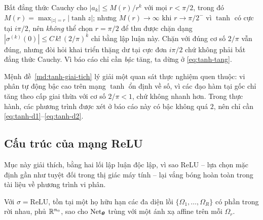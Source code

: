\begin{nhanxet}
Bất đẳng thức Cauchy cho $|a_k| \le M(r)/r^{k}$ với mọi $r < \pi/2$, trong đó
$M(r) = \max_{|z|=r}|\tanh z|$; nhưng $M(r) \to \infty$ khi $r \to \pi/2^{-}$ vì
$\tanh$ có cực tại $i\pi/2$, nên \emph{không} thể chọn $r = \pi/2$ để thu được
chặn dạng $|\sigma^{(k)}(0)| \le C\,k!\,(2/\pi)^k$ chỉ bằng lập luận này. Chặn
với đúng cơ số $2/\pi$ vẫn đúng, nhưng đòi hỏi khai triển thặng dư tại cực đơn
$i\pi/2$ chứ không phải bất đẳng thức Cauchy. Vì báo cáo chỉ cần \emph{bậc}
tăng, ta dừng ở \eqref{eq:tanh-tang}.
\end{nhanxet}
 
Mệnh đề~\ref{md:tanh-giai-tich} lý giải một quan sát thực nghiệm quen thuộc: vi
phân tự động bậc cao trên mạng $\tanh$ ổn định về số, vì các đạo hàm tại gốc chỉ
tăng theo cấp giai thừa với cơ số $2/\pi < 1$, chứ không nhanh hơn. Trong thực hành, các phương
trình được xét ở báo cáo này có bậc không quá $2$, nên chỉ cần
\eqref{eq:tanh-d1}--\eqref{eq:tanh-d2}.
 
\subsection{Cấu trúc của mạng ReLU}
\label{subsec:relu}
 
Mục này giải thích, bằng hai lối lập luận độc lập, vì sao ReLU -- lựa chọn mặc
định gần như tuyệt đối trong thị giác máy tính -- lại vắng bóng hoàn toàn trong
tài liệu về phương trình vi phân.
 
\begin{dinhly}
\label{dl:relu-tuyen-tinh}
Với $\sigma = \mathrm{ReLU}$, tồn tại một họ hữu hạn các đa diện lồi
$\{\Omega_1,\dots,\Omega_R\}$ có phần trong rời nhau, phủ $\mathbb{R}^{n_0}$, sao cho
$\operatorname{Net}_{\bm{\theta}}$ trùng với một ánh xạ affine trên mỗi $\Omega_r$.
\end{dinhly}
 
